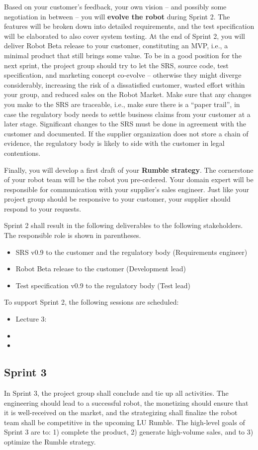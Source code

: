 \documentclass{scrreprt}
\begin{document}
Based on your customer's feedback, your own vision -- and possibly some negotiation in between -- you will \textbf{evolve the robot} during Sprint 2. The features will be broken down into detailed requirements, and the test specification will be elaborated to also cover system testing. At the end of Sprint 2, you will deliver Robot Beta release to your customer, constituting an MVP, i.e., a minimal product that still brings some value. To be in a good position for the next sprint, the project group should try to let the SRS, source code, test specification, and marketing concept co-evolve -- otherwise they might diverge considerably, increasing the risk of a dissatisfied customer, wasted effort within your group, and reduced sales on the Robot Market. Make sure that any changes you make to the SRS are traceable, i.e., make sure there is a ``paper trail'', in case the regulatory body needs to settle business claims from your customer at a later stage. Significant changes to the SRS must be done in agreement with the customer and documented. If the supplier organization does not store a chain of evidence, the regulatory body is likely to side with the customer in legal contentions.

Finally, you will develop a first draft of your \textbf{Rumble strategy}. The cornerstone of your robot team will be the robot you pre-ordered. Your domain expert will be responsible for communication with your supplier's sales engineer. Just like your project group should be responsive to your customer, your supplier should respond to your requests.

Sprint 2 shall result in the following deliverables to the following stakeholders. The responsible role is shown in parentheses.
\begin{itemize}
\item SRS v0.9 to the customer and the regulatory body (Requirements engineer)
\item Robot Beta release to the customer (Development lead)
\item Test specification v0.9 to the regulatory body (Test lead)
\end{itemize}

To support Sprint 2, the following sessions are scheduled:
\begin{itemize}
\item Lecture 3:
\item 
\item
\end{itemize}

\subsection{Sprint 3}
In Sprint 3, the project group shall conclude and tie up all activities. The engineering should lead to a successful robot, the monetizing should ensure that it is well-received on the market, and the strategizing shall finalize the robot team shall be competitive in the upcoming LU Rumble. The high-level goals of Sprint 3 are to: 1) complete the product, 2) generate high-volume sales, and to 3) optimize the Rumble strategy.
\end{document}
